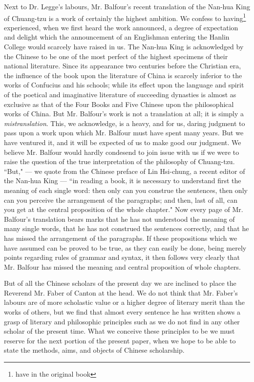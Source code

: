 Next to Dr. Legge's labours, Mr. Balfour's recent translation of the Nan-hua King of Chuang-tzu is a work of certainly the highest ambition.
We confess to having\footnote{have in the original book} experienced, when we first heard the work announced, a degree of expectation and delight which the announcement of an Englishman entering the Hanlin College would scarcely have raised in us.
The Nan-hua King is acknowledged by the Chinese to be one of the most perfect of the highest specimens of their national literature.
Since its appearance two centuries before the Christian era, the influence of the book upon the literature of China is scarcely inferior to the works of Confucius and his schools; while its effect upon the language and spirit of the poetical and imaginative literature of succeeding dynasties is almost as exclusive as that of the Four Books and Five Chinese upon the philosophical works of China.
But Mr. Balfour's work is not a translation at all; it is simply a \emph{mistranslation}.
This, we acknowledge, is a heavy, and for us, daring judgment to pass upon a work upon which Mr. Balfour must have spent many years.
But we have ventured it, and it will be expected of us to make good our judgment.
We believe Mr. Balfour would hardly condesend to join issue with us if we were to raise the question of the true interpretation of the philosophy of Chuang-tzu.
``But," --- we quote from the Chinese preface of Lin Hsi-chung, a recent editor of the Nan-hua King --- ``in reading a book, it is necessary to understand first the meaning of each single word: then only can you construe the sentences, then only can you perceive the arrangement of the paragraphs; and then, last of all, can you get at the central proposition of the whole chapter."
Now every page of Mr. Balfour's translation bears marks that he has not understood the meaning of many single words, that he has not construed the sentences correctly, and that he has missed the arrangement of the paragraphs.
If these propositions which we have assumed can be proved to be true, as they can easily be done, being merely points regarding rules of grammar and syntax, it then follows very clearly that Mr. Balfour has missed the meaning and central proposition of whole chapters.

But of all the Chinese scholars of the present day we are inclined to place the Reverend Mr. Faber of Canton at the head.
We do not think that Mr. Faber's labours are of more scholastic value or a higher degree of literary merit than the works of others, but we find that almost every sentence he has written shows a grasp of literary and philosophic principles such as we do not find in any other scholar of the present time.
What we conceive these principles to be we must reserve for the next portion of the present paper, when we hope to be able to state the methods, aims, and objects of Chinese scholarship.

